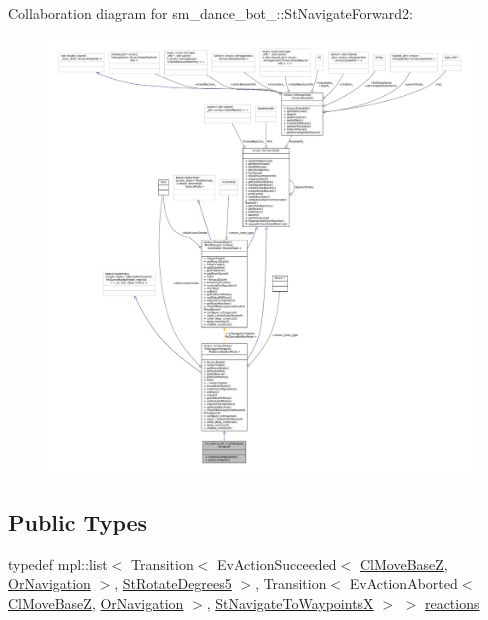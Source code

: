 Collaboration diagram for sm\+\_\+dance\+\_\+bot\+\_\+:\+:St\+Navigate\+Forward2\+:
\nopagebreak
\begin{figure}[H]
\begin{center}
\leavevmode
\includegraphics[width=350pt]{structsm__dance__bot__3_1_1StNavigateForward2__coll__graph}
\end{center}
\end{figure}
\subsection*{Public Types}
\begin{DoxyCompactItemize}
\item 
typedef mpl\+::list$<$ Transition$<$ Ev\+Action\+Succeeded$<$ \hyperlink{classmove__base__z__client_1_1ClMoveBaseZ}{Cl\+Move\+BaseZ}, \hyperlink{classsm__dance__bot__3_1_1OrNavigation}{Or\+Navigation} $>$, \hyperlink{structsm__dance__bot__3_1_1StRotateDegrees5}{St\+Rotate\+Degrees5} $>$, Transition$<$ Ev\+Action\+Aborted$<$ \hyperlink{classmove__base__z__client_1_1ClMoveBaseZ}{Cl\+Move\+BaseZ}, \hyperlink{classsm__dance__bot__3_1_1OrNavigation}{Or\+Navigation} $>$, \hyperlink{structsm__dance__bot__3_1_1StNavigateToWaypointsX}{St\+Navigate\+To\+WaypointsX} $>$ $>$ \hyperlink{structsm__dance__bot__3_1_1StNavigateForward2_a3b94719f33fff52840cf5f577695194b}{reactions}
\end{DoxyCompactItemize}

